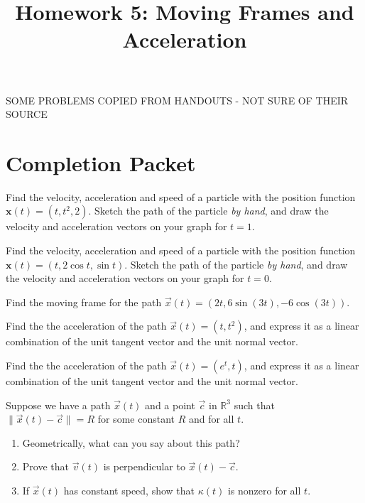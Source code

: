 \documentclass{ximera}
\title{Homework 5: Moving Frames and Acceleration}
\begin{document}
\begin{abstract}
\end{abstract}
\maketitle

SOME PROBLEMS COPIED FROM HANDOUTS - NOT SURE OF THEIR SOURCE

\section*{Completion Packet}

\begin{problem}
Find the velocity, acceleration and speed of a particle with the position function $\mathbf{x}(t) = (t, t^{2}, 2)$. Sketch the path of the particle \emph{by hand}, and draw the velocity and acceleration vectors on your graph for  $t=1$.
\end{problem}

\begin{problem}
Find the velocity, acceleration and speed of a particle with the position function $\mathbf{x}(t) = (t, 2 \cos{t}, \sin{t})$. Sketch the path of the particle \emph{by hand}, and draw the velocity and acceleration vectors on your graph for  $t=0$.
\end{problem}

\begin{problem}
Find the moving frame for the path $\vec{x}(t) = (2t, 6\sin(3t), -6\cos(3t))$.
\end{problem}

\begin{problem}
Find the the acceleration of the path $\vec{x}(t) = (t,t^2)$, and express it as a linear combination of the unit tangent vector and the unit normal vector.
\end{problem}

\begin{problem}
Find the the acceleration of the path $\vec{x}(t) = (e^t, t)$, and express it as a linear combination of the unit tangent vector and the unit normal vector.
\end{problem}

\begin{problem}
Suppose we have a path $\vec{x}(t)$ and a point $\vec{c}$ in $\mathbb{R}^3$ such that 
$\|\vec{x}(t)-\vec{c}\|=R$ for some constant $R$ and for all $t$.
\begin{enumerate}
\item Geometrically, what can you say about this path?
\item Prove that $\vec{v}(t)$ is perpendicular to $\vec{x}(t)-\vec{c}$.
\item If $\vec{x}(t)$ has constant speed, show that $\kappa(t)$ is nonzero for all $t$.
\end{enumerate}
\end{problem}
\end{document}

